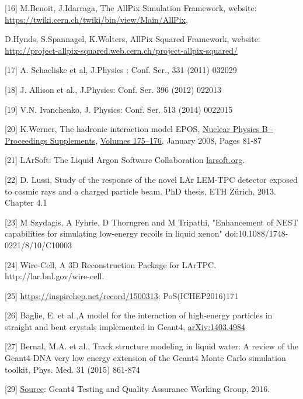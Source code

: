 \documentclass[12pt,a4paper]{article}
\begin{document}
{[}16{]} M.Benoit, J.Idarraga, The AllPix Simulation Framework, website:
\href{https://twiki.cern.ch/twiki/bin/view/Main/AllPix}{{https://twiki.cern.ch/twiki/bin/view/Main/AllPix}},

D.Hynds, S.Spannagel, K.Wolters, AllPix Squared Framework, website:
\href{http://project-allpix-squared.web.cern.ch/project-allpix-squared/}{{http://project-allpix-squared.web.cern.ch/project-allpix-squared/}}

{[}17{]} A. Schaeliske et al, J.Physics : Conf. Ser., 331 (2011) 032029

{[}18{]} J. Allison et al., J.Physics: Conf. Ser. 396 (2012) 022013

{[}19{]} V.N. Ivanchenko, J. Physics: Conf. Ser. 513 (2014) 0022015

{[}20{]} K.Werner, The hadronic interaction model EPOS,
\href{http://www.sciencedirect.com/science/journal/09205632}{Nuclear
Physics B - Proceedings Supplements},
\href{http://www.sciencedirect.com/science/journal/09205632/175/supp/C}{Volumes
175--176}, January 2008, Pages 81-87

{[}21{]} LArSoft: The Liquid Argon Software Collaboration
\href{http://larsoft.org}{{larsoft.org}}.

{[}22{]} D. Lussi, Study of the response of the novel LAr LEM-TPC
detector exposed to cosmic rays and a charged particle beam. PhD thesis,
ETH Zürich, 2013. Chapter 4.1

{[}23{]} M Szydagis, A Fyhrie, D Thorngren and M Tripathi, "Enhancement
of NEST capabilities for simulating low-energy recoils in liquid xenon"
doi:10.1088/1748-0221/8/10/C10003

{[}24{]} Wire-Cell, A 3D Reconstruction Package for LArTPC.
http://lar.bnl.gov/wire-cell.

{[}25{]}
\href{https://inspirehep.net/record/1500313}{{https://inspirehep.net/record/1500313}};
PoS(ICHEP2016)171

{[}26{]} Baglie, E. et al.,A model for the interaction of high-energy
particles in straight and bent crystals implemented in Geant4,
\href{https://arxiv.org/abs/1403.4984}{{arXiv:1403.4984}}

{[}27{]} Bernal, M.A. et al., Track structure modeling in liquid water:
A review of the Geant4-DNA very low energy extension of the Geant4 Monte
Carlo simulation toolkit, Phys. Med. 31 (2015) 861-874

{[}29{]}
\href{https://g4cpt.fnal.gov/g4p/prplots/cpu_by_version.html}{{Source}}:
Geant4 Testing and Quality Assurance Working Group, 2016.
\end{document}
